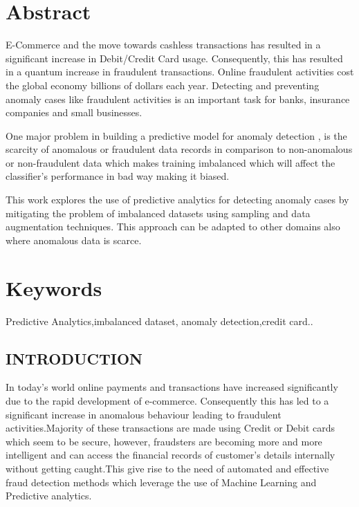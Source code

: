 \documentclass[a4paper, 12pt]{article}
\begin{document}
\newpage
\tableofcontents

\newpage
\listoftables
\listoffigures

\newpage

\section*{Abstract}
E-Commerce and the move towards cashless transactions has resulted in a 
significant increase in Debit/Credit Card usage. Consequently, this has resulted in 
a quantum increase in fraudulent transactions. Online fraudulent activities cost the 
global economy billions of dollars each year. Detecting and preventing anomaly 
cases like fraudulent activities is an important task for banks, insurance companies 
and small businesses.
\par 
One major problem in building a predictive model for 
anomaly detection , is the scarcity of anomalous or fraudulent data records in 
comparison to non-anomalous or non-fraudulent data which makes training 
imbalanced which will affect the classifier’s performance in bad way making it 
biased. 
\par
This work explores the use of predictive analytics for detecting anomaly 
cases by mitigating the problem of imbalanced datasets using sampling and data 
augmentation techniques. This approach can be adapted to other domains also 
where anomalous data is scarce.
  
\section*{Keywords}
Predictive Analytics,imbalanced dataset, anomaly detection,credit card..
\newpage
{}
\begin{center}
\section{INTRODUCTION}
\end{center}
\par
In today's world online payments and transactions have increased significantly due to the rapid development of e-commerce. Consequently this has led to a significant increase in anomalous behaviour leading to fraudulent activities.Majority of these transactions are made using Credit or Debit cards which seem to be secure, however, fraudsters are becoming more and more intelligent and can access the financial records of customer's details internally without getting caught.This give rise to the need of automated and effective  fraud detection methods which leverage the use of Machine Learning and Predictive analytics.
 \\ 
 
\end{document}
